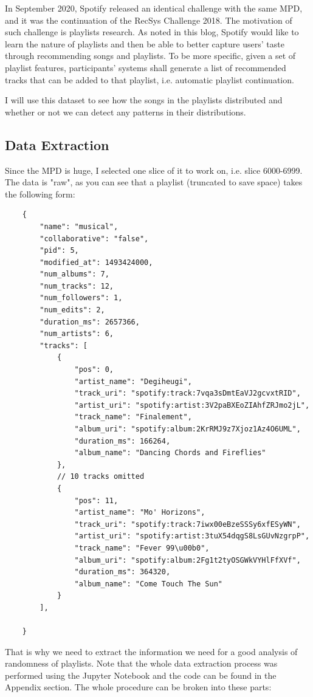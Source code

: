 \documentclass[12pt]{article}
\theoremstyle{plain}
\theoremstyle{definition}
\theoremstyle{remark}
\begin{document}
In September 2020, Spotify released an identical challenge with the same MPD, and it was the continuation of the RecSys Challenge 2018. The motivation of such challenge is playlists research. As noted in this blog\cite{2.1}, Spotify would like to learn the nature of playlists and then be able to better capture users' taste through recommending songs and playlists. To be more specific, given a set of playlist features, participants' systems shall generate a list of recommended tracks that can be added to that playlist, i.e. automatic playlist continuation.

I will use this dataset to see how the songs in the playlists distributed and whether or not we can detect any patterns in their distributions.

\subsection{Data Extraction}
Since the MPD is huge, I selected one slice of it to work on, i.e. slice 6000-6999. The data is "raw", as you can see that a playlist (truncated to save space) takes the following form\cite{2.1}: 
\begin{verbatim}
    {
        "name": "musical",
        "collaborative": "false",
        "pid": 5,
        "modified_at": 1493424000,
        "num_albums": 7,
        "num_tracks": 12,
        "num_followers": 1,
        "num_edits": 2,
        "duration_ms": 2657366,
        "num_artists": 6,
        "tracks": [
            {
                "pos": 0,
                "artist_name": "Degiheugi",
                "track_uri": "spotify:track:7vqa3sDmtEaVJ2gcvxtRID",
                "artist_uri": "spotify:artist:3V2paBXEoZIAhfZRJmo2jL",
                "track_name": "Finalement",
                "album_uri": "spotify:album:2KrRMJ9z7Xjoz1Az4O6UML",
                "duration_ms": 166264,
                "album_name": "Dancing Chords and Fireflies"
            },
            // 10 tracks omitted
            {
                "pos": 11,
                "artist_name": "Mo' Horizons",
                "track_uri": "spotify:track:7iwx00eBzeSSSy6xfESyWN",
                "artist_uri": "spotify:artist:3tuX54dqgS8LsGUvNzgrpP",
                "track_name": "Fever 99\u00b0",
                "album_uri": "spotify:album:2Fg1t2tyOSGWkVYHlFfXVf",
                "duration_ms": 364320,
                "album_name": "Come Touch The Sun"
            }
        ],

    }
\end{verbatim}
That is why we need to extract the information we need for a good analysis of randomness of playlists. Note that the whole data extraction process was performed using the Jupyter Notebook and the code can be found in the Appendix section. The whole procedure can be broken into these parts: 
\end{document}
